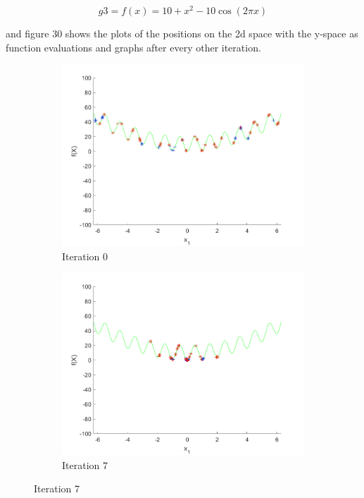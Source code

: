 $$
  g3=f(x) = 10 + x^2 - 10 \cos(2\pi x)
$$

and figure 30 shows the plots of the positions on the 2d space with the y-space as function evaluations and graphs after every other iteration.

\begin{figure}
  \centering
  \begin{subfigure}[b]{0.4\textwidth}
    \includegraphics[width=\textwidth]{img/smpl/rast1d/loa-iter-0}
    \caption{Iteration 0}
    \label{fig:s3-iter-0}
  \end{subfigure}
  \begin{subfigure}[b]{0.4\textwidth}
    \includegraphics[width=\textwidth]{img/smpl/rast1d/loa-iter-7}
    \caption{Iteration 7}

\end{subfigure}
\end{figure}
